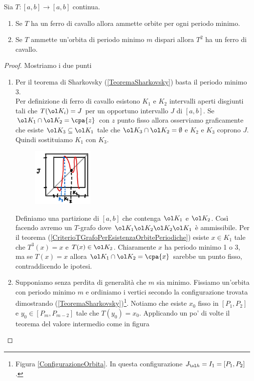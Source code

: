 \begin{proposition}\label{RelazioneFerroDiCavalloEPeriodiMinimi}
Sia $T:[a,b]\to[a,b]$ continua.
\begin{enumerate}
\item Se $T$ ha un ferro di cavallo allora ammette orbite per ogni periodo minimo.
\item Se $T$ ammette un'orbita di periodo minimo $m$ dispari allora $T^2$ ha un ferro di cavallo. 
\end{enumerate}
\end{proposition}
\begin{proof}
Mostriamo i due punti
\setlength{\leftmargini}{0cm}
\begin{enumerate}
\item Per il teorema di Sharkovsky (\ref{TeoremaSharkovsky}) basta il periodo minimo 3.\\ 
Per definizione di ferro di cavallo esistono $K_1$ e $K_2$ intervalli aperti disgiunti tali che $T(\ol K_i)=J$ per un opportuno intervallo $J$ di $[a,b]$. Se $\ol K_1\cap \ol K_2=\cpa{z}$ con $z$ punto fisso allora osserviamo graficamente che esiste $\ol K_3\subseteq \ol K_1$ tale che $\ol K_3\cap \ol K_2=\emptyset$ e $K_2$ e $K_3$ coprono $J$. Quindi sostituiamo $K_1$ con $K_3$.

\begin{figure}[!htb]
	\centering
	\includegraphics[width=3cm]{Immagini/esempio_Dimostrazione_ferro_di_cavallo.png}
\end{figure}

Definiamo una partizione di $[a,b]$ che contenga $\ol K_1$ e $\ol K_2$. Cos\`i facendo avremo un $T$-grafo dove $\ol K_1\ol K_2\ol K_2\ol K_1$ \`e ammissibile. Per il teorema (\ref{CriterioTGrafoPerEsistenzaOrbitePeriodiche}) esiste $x\in K_1$ tale che $T^3(x)=x$ e $T(x)\in \ol K_2$. Chiaramente $x$ ha periodo minimo 1 o 3, ma se $T(x)=x$ allora $\ol K_1\cap \ol K_2=\cpa{x}$ sarebbe un punto fisso, contraddicendo le ipotesi.
\item Supponiamo senza perdita di generalit\`a che $m$ sia minimo. Fissiamo un'orbita con periodo minimo $m$ e ordiniamo i vertici secondo la configurazione trovata dimostrando (\ref{TeoremaSharkovsky})\footnote{Figura \ref{ConfigurazioneOrbita}. In questa configurazione $J_{\ol h}=I_1=[P_1,P_2]$.}. Notiamo che esiste $x_0$ fisso in $[P_1,P_2]$ e $y_0\in [P_{m},P_{m-2}]$ tale che $T(y_0)=x_0$. Applicando un po' di volte il teorema del valore intermedio come in figura 


\end{enumerate}
\end{proof}
